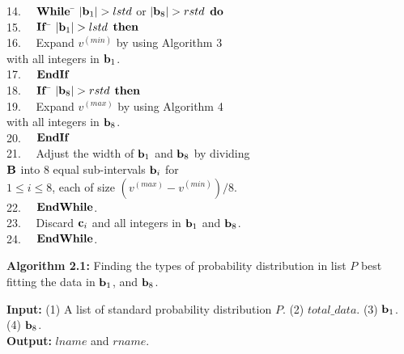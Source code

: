 \documentclass[lettersize,journal]{IEEEtran}
\begin{document}
\begin{tabbing}
14.~~\>               \> ${\bf While}$ \= $|{\bf b}_{1}| > lstd$ or $|{\bf b}_{8}| > rstd$ ${\bf do}$ \\
15.~~\>               \>               \> ${\bf If}$ \= $|{\bf b}_{1}| > lstd$ ${\bf then}$ \\
16.~~\>               \>               \>            \> Expand $v^{(min)}$ by using Algorithm 3 \\
     \>               \>               \>            \> with all integers in ${\bf b}_{1}$. \\
17.~~\>               \>               \> ${\bf EndIf}$ \\
18.~~\>               \>               \> ${\bf If}$ \= $|{\bf b}_{8}| > rstd$ ${\bf then}$ \\
19.~~\>               \>               \>            \> Expand $v^{(max)}$ by using Algorithm 4 \\
     \>               \>               \>            \> with all integers in ${\bf b}_{8}$. \\
20.~~\>               \>               \> ${\bf EndIf}$ \\
21.~~\>               \>               \> Adjust the width of ${\bf b}_{1}$ and ${\bf b}_{8}$ by dividing\\
     \>               \>               \> ${\bf B}$ into 8 equal sub-intervals ${\bf b}_{i}$ for \\
     \>               \>               \> $1 \leq i \leq 8$, each of size {\small 
                                          $(v^{(max)} - v^{(min)})/8$}. \\
22.~~\>               \> ${\bf EndWhile}$. \\
23.~~\>               \> Discard ${\bf c}_{i}$ and all integers in ${\bf b}_{1}$ and ${\bf b}_{8}$. \\
24.~~\> ${\bf EndWhile}$.      
\end{tabbing}

\vspace{0.2in}
\noindent
{\bf Algorithm 2.1:} Finding the types of probability distribution in list $P$ best fitting the data in 
${\bf b}_{1}$, and ${\bf b}_{8}$.

\noindent
{\bf Input:} (1) A list of standard probability distribution $P$. (2) $total\_data$. (3) ${\bf b}_{1}$.
(4) ${\bf b}_{8}$. \\
{\bf Output:} $lname$ and $rname$.

\vspace{0.2in}
\noindent
\end{document}

